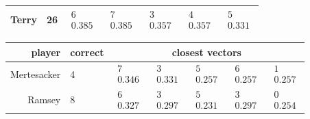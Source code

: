 \documentclass[10pt, a4paper]{UUThesisTemplate}
\begin{document}
\begin{table}[hb]
\begin{tabular}{r l c c c c c}
Terry & 26 & $\begin{matrix} \text{6} \\ 0.385 \end{matrix}$  & $\begin{matrix} \text{7} \\ 0.385 \end{matrix}$  & $\begin{matrix} \text{3} \\ 0.357 \end{matrix}$  & $\begin{matrix} \text{4} \\ 0.357 \end{matrix}$  & $\begin{matrix} \text{5} \\ 0.331 \end{matrix}$\\\hline
\end{tabular}
\begin{tabular}{r l c c c c c}
player & correct\hspace{-20pt} & \multicolumn{5}{c}{closest vectors}\\\hline
Mertesacker & 4 & $\begin{matrix} \text{7} \\ 0.346 \end{matrix}$  & $\begin{matrix} \text{3} \\ 0.331 \end{matrix}$  & $\begin{matrix} \text{5} \\ 0.257 \end{matrix}$  & $\begin{matrix} \text{6} \\ 0.257 \end{matrix}$  & $\begin{matrix} \text{1} \\ 0.257 \end{matrix}$\\
Ramsey & 8 & $\begin{matrix} \text{6} \\ 0.327 \end{matrix}$  & $\begin{matrix} \text{3} \\ 0.297 \end{matrix}$  & $\begin{matrix} \text{5} \\ 0.231 \end{matrix}$  & $\begin{matrix} \text{3} \\ 0.297 \end{matrix}$  & $\begin{matrix} \text{0} \\ 0.254 \end{matrix}$\\

\end{tabular}
\end{table}
\end{document}
